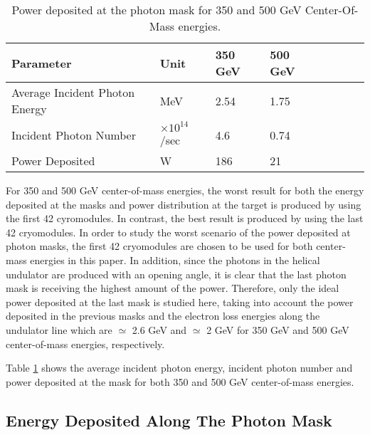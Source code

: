 \documentclass[a4paper]{article}
\begin{document}
\begin{table}[h]

\caption[ILC undulator parameters]{Power deposited at the photon mask for 350 and 500 GeV Center-Of-Mass energies.}
\centering %
\begin{tabular}{l*{6}{l}r} %
\hline\hline %



Parameter &              Unit  & 350 GeV & 500 GeV\\


\hline %

Average Incident Photon Energy & MeV&   2.54   & 1.75  \\
Incident Photon Number & $\times10^{14}$/sec & 4.6  & 0.74\\
Power Deposited & W  &  186 &  21  \\



\hline %
\end{tabular}
\label{HUSR} %
\end{table}

For 350 and 500 GeV center-of-mass energies, the worst result for both the energy deposited at the masks and power distribution at the target is produced by using the first 42 cyromodules. In contrast, the best result is produced by using the last 42 cryomodules. In order to study the worst scenario of the power deposited at photon masks, the first 42 cryomodules are chosen to be used for both center-mass energies in this paper. In addition, since the photons in the helical undulator are produced with an opening angle, it is clear that the last photon mask is receiving the highest amount of the power. Therefore, only the ideal power deposited at the last mask is studied here, taking into account the power deposited in the previous masks and the electron loss energies along the undulator line which are $\simeq$ 2.6 GeV and  $\simeq$ 2 GeV for 350 GeV and 500 GeV center-of-mass energies, respectively.

Table \ref {HUSR} shows the average incident photon energy, incident photon number and power deposited at the mask for both 350 and 500 GeV center-of-mass energies.


\subsection{Energy Deposited Along The Photon Mask}
\end{document}
